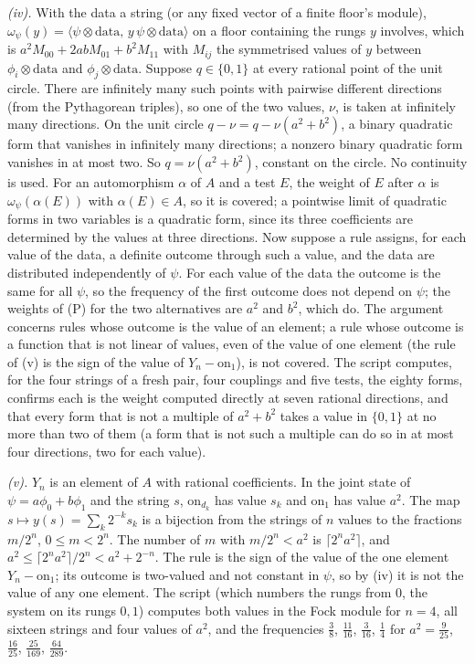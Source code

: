 \emph{(iv).} With the data a string (or any fixed vector of a finite floor's module), $\omega_{\psi}(y) = \langle\psi \otimes \mathrm{data},\, y\,\psi \otimes \mathrm{data}\rangle$ on a floor containing the rungs $y$ involves, which is $a^{2}M_{00} + 2abM_{01} + b^{2}M_{11}$ with $M_{ij}$ the symmetrised values of $y$ between $\phi_{i} \otimes \mathrm{data}$ and $\phi_{j} \otimes \mathrm{data}$. Suppose $q \in \{0, 1\}$ at every rational point of the unit circle. There are infinitely many such points with pairwise different directions (from the Pythagorean triples), so one of the two values, $\nu$, is taken at infinitely many directions. On the unit circle $q - \nu = q - \nu(a^{2} + b^{2})$, a binary quadratic form that vanishes in infinitely many directions; a nonzero binary quadratic form vanishes in at most two. So $q = \nu(a^{2} + b^{2})$, constant on the circle. No continuity is used. For an automorphism $\alpha$ of $A$ and a test $E$, the weight of $E$ after $\alpha$ is $\omega_{\psi}(\alpha(E))$ with $\alpha(E) \in A$, so it is covered; a pointwise limit of quadratic forms in two variables is a quadratic form, since its three coefficients are determined by the values at three directions. Now suppose a rule assigns, for each value of the data, a definite outcome through such a value, and the data are distributed independently of $\psi$. For each value of the data the outcome is the same for all $\psi$, so the frequency of the first outcome does not depend on $\psi$; the weights of (P) for the two alternatives are $a^{2}$ and $b^{2}$, which do. The argument concerns rules whose outcome is the value of an element; a rule whose outcome is a function that is not linear of values, even of the value of one element (the rule of (v) is the sign of the value of $Y_{n} - \mathrm{on}_{1}$), is not covered. The script computes, for the four strings of a fresh pair, four couplings and five tests, the eighty forms, confirms each is the weight computed directly at seven rational directions, and that every form that is not a multiple of $a^{2} + b^{2}$ takes a value in $\{0, 1\}$ at no more than two of them (a form that is not such a multiple can do so in at most four directions, two for each value).

\emph{(v).} $Y_{n}$ is an element of $A$ with rational coefficients. In the joint state of $\psi = a\phi_{0} + b\phi_{1}$ and the string $s$, $\mathrm{on}_{d_{k}}$ has value $s_{k}$ and $\mathrm{on}_{1}$ has value $a^{2}$. The map $s \mapsto y(s) = \sum_{k}2^{-k}s_{k}$ is a bijection from the strings of $n$ values to the fractions $m/2^{n}$, $0 \le m < 2^{n}$. The number of $m$ with $m/2^{n} < a^{2}$ is $\lceil 2^{n}a^{2}\rceil$, and $a^{2} \le \lceil 2^{n}a^{2}\rceil/2^{n} < a^{2} + 2^{-n}$. The rule is the sign of the value of the one element $Y_{n} - \mathrm{on}_{1}$; its outcome is two-valued and not constant in $\psi$, so by (iv) it is not the value of any one element. The script (which numbers the rungs from $0$, the system on its rungs $0, 1$) computes both values in the Fock module for $n = 4$, all sixteen strings and four values of $a^{2}$, and the frequencies $\tfrac38$, $\tfrac{11}{16}$, $\tfrac{3}{16}$, $\tfrac14$ for $a^{2} = \tfrac{9}{25}$, $\tfrac{16}{25}$, $\tfrac{25}{169}$, $\tfrac{64}{289}$.

